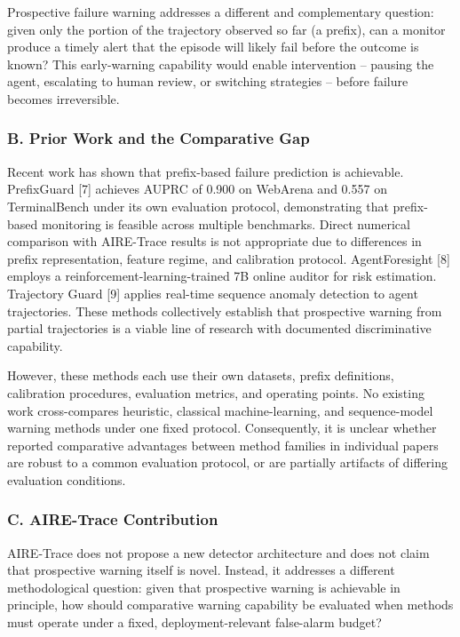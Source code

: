 \documentclass[
]{article}
\begin{document}
Prospective failure warning addresses a different and complementary
question: given only the portion of the trajectory observed so far (a
prefix), can a monitor produce a timely alert that the episode will
likely fail before the outcome is known? This early-warning capability
would enable intervention -- pausing the agent, escalating to human
review, or switching strategies -- before failure becomes irreversible.

\subsubsection{B. Prior Work and the Comparative
Gap}\label{b.-prior-work-and-the-comparative-gap}

Recent work has shown that prefix-based failure prediction is
achievable. PrefixGuard {[}7{]} achieves AUPRC of 0.900 on WebArena and
0.557 on TerminalBench under its own evaluation protocol, demonstrating
that prefix-based monitoring is feasible across multiple benchmarks.
Direct numerical comparison with AIRE-Trace results is not appropriate
due to differences in prefix representation, feature regime, and
calibration protocol. AgentForesight {[}8{]} employs a
reinforcement-learning-trained 7B online auditor for risk estimation.
Trajectory Guard {[}9{]} applies real-time sequence anomaly detection to
agent trajectories. These methods collectively establish that
prospective warning from partial trajectories is a viable line of
research with documented discriminative capability.

However, these methods each use their own datasets, prefix definitions,
calibration procedures, evaluation metrics, and operating points. No
existing work cross-compares heuristic, classical machine-learning, and
sequence-model warning methods under one fixed protocol. Consequently,
it is unclear whether reported comparative advantages between method
families in individual papers are robust to a common evaluation
protocol, or are partially artifacts of differing evaluation conditions.

\subsubsection{C. AIRE-Trace
Contribution}\label{c.-aire-trace-contribution}

AIRE-Trace does not propose a new detector architecture and does not
claim that prospective warning itself is novel. Instead, it addresses a
different methodological question: given that prospective warning is
achievable in principle, how should comparative warning capability be
evaluated when methods must operate under a fixed, deployment-relevant
false-alarm budget?
\end{document}

